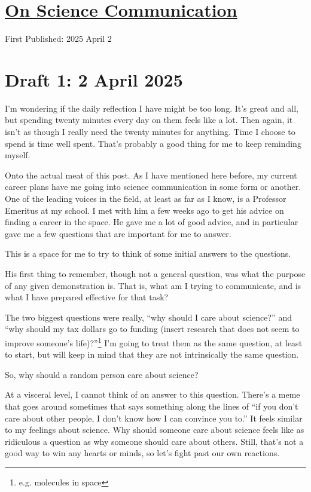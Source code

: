 \documentclass[12pt]{article}[titlepage]
\newcommand{\say}[1]{``#1''}
\renewcommand{\,}{\textsuperscript{,}}
\begin{document}
\doublespacing
\section{\href{science-communication.html}{On Science Communication}}
First Published: 2025 April 2

\section{Draft 1: 2 April 2025}  
I'm wondering if the daily reflection I have might be too long. It's great and all, but spending twenty minutes every day on them feels like a lot.  
Then again, it isn't as though I really need the twenty minutes for anything.  
Time I choose to spend is time well spent.  
That's probably a good thing for me to keep reminding myself.

Onto the actual meat of this post.  
As I have mentioned here before, my current career plans have me going into science communication in some form or another.  
One of the leading voices in the field, at least as far as I know, is a Professor Emeritus at my school.  
I met with him a few weeks ago to get his advice on finding a career in the space.  
He gave me a lot of good advice, and in particular gave me a few questions that are important for me to answer.

This is a space for me to try to think of some initial answers to the questions.

His first thing to remember, though not a general question, was what the purpose of any given demonstration is.  
That is, what am I trying to communicate, and is what I have prepared effective for that task?

The two biggest questions were really, \say{why should I care about science?} and \say{why should my tax dollars go to funding (insert research that does not seem to improve someone's life)?}\footnote{e.g. molecules in space}  
I'm going to treat them as the same question, at least to start, but will keep in mind that they are not intrinsically the same question.

So, why should a random person care about science?

At a visceral level, I cannot think of an answer to this question.  
There's a meme that goes around sometimes that says something along the lines of \say{if you don't care about other people, I don't know how I can convince you to.}  
It feels similar to my feelings about science.  
Why should someone care about science feels like as ridiculous a question as why someone should care about others.  
Still, that's not a good way to win any hearts or minds, so let's fight past our own reactions.
\end{document}
